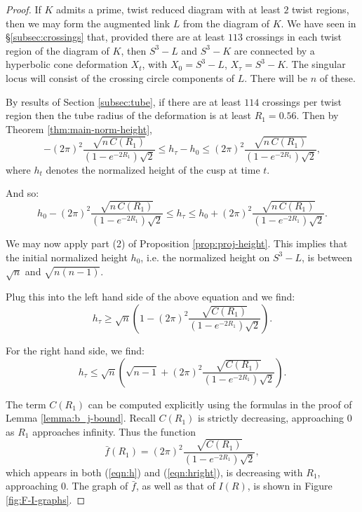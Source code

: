 \begin{proof}
  
  If $K$ admits a prime, twist reduced diagram with at least $2$ twist
  regions, then we may form the augmented link $L$ from the diagram of
  $K$.  We have seen in \S\ref{subsec:crossings} that, provided there
  are at least $113$ crossings in each twist region of the diagram of
  $K$, then $S^3-L$ and $S^3-K$ are connected by a hyperbolic cone
  deformation $X_t$, with $X_0=S^3-L$, $X_\tau=S^3-K$.  The singular
  locus will consist of the crossing circle components of $L$.  There
  will be $n$ of these.
  
  By results of Section \ref{subsec:tube}, if there are at least $114$
  crossings per twist region then the tube radius of the deformation
  is at least $R_1=0.56$.  Then by Theorem \ref{thm:main-norm-height}, 
  $$ -(2\pi)^2\frac{\sqrt{n\,C(R_1)}}{(1-e^{-2R_1})\sqrt{2}}
  \leq h_\tau-h_0
  \leq
  (2\pi)^2\frac{\sqrt{n\,C(R_1)}}{(1-e^{-2R_1})\sqrt{2}},$$
  where $h_t$ denotes the normalized height of the cusp at time $t$.
  
And so:
\begin{equation}
 h_0 - (2\pi)^2 \frac{\sqrt{n\,C(R_1)}}{(1-e^{-2R_1})\sqrt{2}} \leq
h_\tau \leq
h_0 + (2\pi)^2 \frac{\sqrt{n\,C(R_1)}}{(1-e^{-2R_1})\sqrt{2}}.
\label{eqn:2-sides}
\end{equation}

We may now apply part (2) of Proposition \ref{prop:proj-height}.  This
implies that the initial normalized height $h_0$, i.e. the normalized
height on $S^3-L$, is between $\sqrt{n}$ and $\sqrt{n(n-1)}$.

Plug this into the left hand side of the above equation and we find:
\begin{equation}
h_\tau \geq \sqrt{n}\left(1-(2\pi)^2
  \frac{\sqrt{C(R_1)}}{(1-e^{-2R_1})\sqrt{2}}\right).
\label{eqn:h}
\end{equation}

For the right hand side, we find:
\begin{equation}
  h_\tau \leq \sqrt{n}\left(\sqrt{n-1} + (2\pi)^2
  \frac{\sqrt{C(R_1)}}{(1-e^{-2R_1})\sqrt{2}}\right).
\label{eqn:hright}
\end{equation}

The term $C(R_1)$ can be computed explicitly using the formulas in the
proof of 
Lemma \ref{lemma:b_j-bound}.  Recall $C(R_1)$ is strictly decreasing,
approaching $0$ as $R_1$ approaches infinity.  Thus the function
$$\bar{f}(R_1)= (2\pi)^2\frac{\sqrt{C(R_1)}}{(1-e^{-2R_1})\sqrt{2}},$$
which appears in both (\ref{eqn:h}) and (\ref{eqn:hright}), is
decreasing with $R_1$, approaching $0$.  The graph of $\bar{f}$, as
well as that of $I(R)$, is shown in Figure \ref{fig:F-I-graphs}.


\end{proof}
